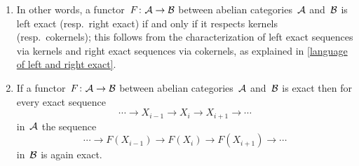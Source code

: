 \begin{remark*}
  \leavevmode
  \begin{enumerate}
    \item
      In other words, a functor~$F \colon \mathcal{A} \to \mathcal{B}$ between abelian categories~$\mathcal{A}$ and~$\mathcal{B}$ is left exact (resp.\ right exact) if and only if it respects kernels (resp.\ cokernels);
      this follows from the characterization of left exact sequences via kernels and right exact sequences via cokernels, as explained in \cref{language of left and right exact}.
    \item
      If a functor~$F \colon \mathcal{A} \to \mathcal{B}$ between abelian categories~$\mathcal{A}$ and~$\mathcal{B}$ is exact then for every exact sequence
      \[
        \dotsb
        \to
        X_{i-1}
        \to
        X_i
        \to
        X_{i+1}
        \to
        \dotsb
      \]
      in~$\mathcal{A}$ the sequence
      \[
        \dotsb
        \to
        F(X_{i-1})
        \to
        F(X_i)
        \to
        F(X_{i+1})
        \to
        \dotsb
      \]
      in~$\mathcal{B}$ is again exact.
  \end{enumerate}
\end{remark*}


